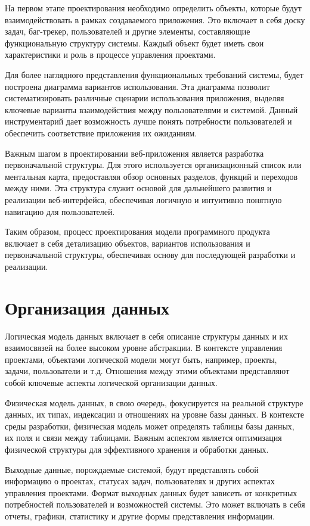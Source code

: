 \documentclass[12pt,a4paper,draft]{belgost/belgost}
\begin{document}
На первом этапе проектирования необходимо определить объекты, которые будут взаимодействовать в рамках создаваемого приложения.
Это включает в себя доску задач, баг-трекер, пользователей и другие элементы, составляющие функциональную структуру системы.
Каждый объект будет иметь свои характеристики и роль в процессе управления проектами.

Для более наглядного представления функциональных требований системы, будет построена диаграмма вариантов использования.
Эта диаграмма позволит систематизировать различные сценарии использования приложения, выделяя ключевые варианты взаимодействия между пользователями и системой.
Данный инструментарий дает возможность лучше понять потребности пользователей и обеспечить соответствие приложения их ожиданиям.

Важным шагом в проектировании веб-приложения является разработка первоначальной структуры.
Для этого используется организационный список или ментальная карта, предоставляя обзор основных разделов, функций и переходов между ними.
Эта структура служит основой для дальнейшего развития и реализации веб-интерфейса, обеспечивая логичную и интуитивно понятную навигацию для пользователей.

Таким образом, процесс проектирования модели программного продукта включает в себя детализацию объектов, вариантов использования и первоначальной структуры, обеспечивая основу для последующей разработки и реализации.

\section{Организация данных}

Логическая модель данных включает в себя описание структуры данных и их взаимосвязей на более высоком уровне абстракции.
В контексте управления проектами, объектами логической модели могут быть, например, проекты, задачи, пользователи и т.д.
Отношения между этими объектами представляют собой ключевые аспекты логической организации данных.

Физическая модель данных, в свою очередь, фокусируется на реальной структуре данных, их типах, индексации и отношениях на уровне базы данных.
В контексте среды разработки, физическая модель может определять таблицы базы данных, их поля и связи между таблицами. Важным аспектом является оптимизация физической структуры для эффективного хранения и обработки данных.

Выходные данные, порождаемые системой, будут представлять собой информацию о проектах, статусах задач, пользователях и других аспектах управления проектами.
Формат выходных данных будет зависеть от конкретных потребностей пользователей и возможностей системы. Это может включать в себя отчеты, графики, статистику и другие формы представления информации.
\end{document}
